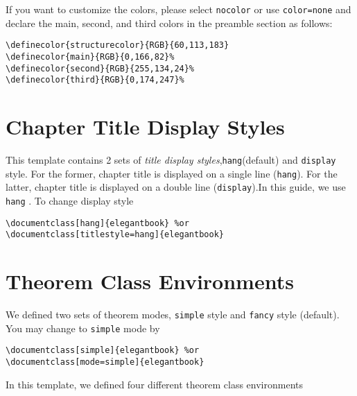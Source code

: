 \documentclass[fancy,blue,11pt]{elegantbook}
\begin{document}
If you want to customize the colors, please select \lstinline{nocolor} or use \lstinline{color=none} and declare the main, second, and third colors in the preamble section as follows:
\begin{lstlisting}[frame=single]
\definecolor{structurecolor}{RGB}{60,113,183}
\definecolor{main}{RGB}{0,166,82}%
\definecolor{second}{RGB}{255,134,24}%
\definecolor{third}{RGB}{0,174,247}% 
\end{lstlisting}


\section{Chapter Title Display Styles}

This template contains 2 sets of \textit{title display styles},\lstinline{hang}(default) and \lstinline{display} style. For the former, chapter title is displayed on a single line (\lstinline{hang}). For the latter, chapter title is displayed on a double line (\lstinline{display}).In this guide, we use \lstinline{hang} . To change display style
\begin{lstlisting}
\documentclass[hang]{elegantbook} %or
\documentclass[titlestyle=hang]{elegantbook}
\end{lstlisting}

\section{Theorem Class Environments}
We defined two sets of theorem modes, \lstinline{simple} style and \lstinline{fancy} style (default). You may change to \lstinline{simple} mode by

\begin{lstlisting}
\documentclass[simple]{elegantbook} %or
\documentclass[mode=simple]{elegantbook}
\end{lstlisting}

In this template, we defined four different theorem class environments
\end{document}
